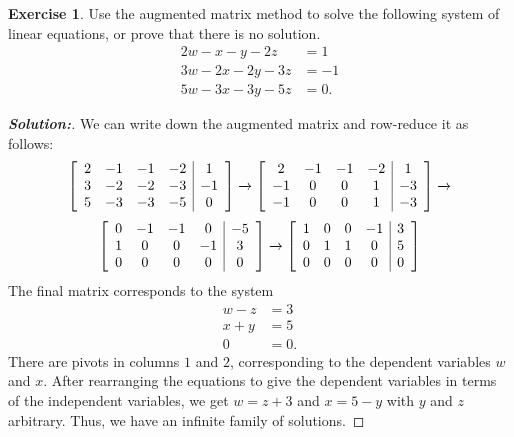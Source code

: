 \documentclass[a4paper]{amsart}
\theoremstyle{definition}
\newtheorem{exercise}{Exercise}
\newenvironment{solution}{\begin{proof}[\textbf{Solution:}] \vphantom{u}}{\end{proof}}
\begin{document}
\begin{exercise}\label{ex-solve-ii}
 Use the augmented matrix method to solve the following system of
 linear equations, or prove that there is no solution.
 \begin{align*}
  2w - x - y - 2z &= 1 \\
  3w - 2x - 2y - 3z &= -1 \\
  5w - 3x - 3y - 5z &= 0.
 \end{align*}
\end{exercise}
\begin{solution}
 We can write down the augmented matrix and row-reduce it as follows: 
 \[ \left[\begin{array}{cccc|c}
     2 & -1 & -1 & -2 & 1 \\
     3 & -2 & -2 & -3 & -1 \\
     5 & -3 & -3 & -5 & 0 
    \end{array}\right]
    \xrightarrow{}
    \left[\begin{array}{cccc|c}
     2 & -1 & -1 & -2 & 1 \\
    -1 &  0 &  0 &  1 & -3 \\
    -1 &  0 &  0 &  1 & -3 
    \end{array}\right]
    \xrightarrow{}
 \] \[
    \left[\begin{array}{cccc|c}
     0 & -1 & -1 &  0 & -5 \\
     1 &  0 &  0 & -1 & 3 \\
     0 &  0 &  0 &  0 & 0 
    \end{array}\right]
    \xrightarrow{}
    \left[\begin{array}{cccc|c}
     1 &  0 &  0 & -1 & 3 \\
     0 &  1 &  1 &  0 & 5 \\
     0 &  0 &  0 &  0 & 0 
    \end{array}\right]
 \]
 The final matrix corresponds to the system 
 \begin{align*}
  w-z &= 3 \\
  x+y &= 5 \\
  0 &= 0.
 \end{align*}
 There are pivots in columns $1$ and $2$, corresponding to the dependent
 variables $w$ and $x$.  After rearranging the equations to give the
 dependent variables in terms of the independent variables, we get
 $w=z+3$ and $x=5-y$ with $y$ and $z$ arbitrary.  Thus, we have an
 infinite family of solutions.
\end{solution}
\end{document}
